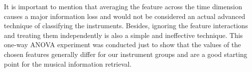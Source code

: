 It is important to mention that averaging the feature across the time dimension causes a major information loss and would not be considered an actual advanced technique of classifying the instruments. Besides, ignoring the feature interactions and treating them independently is also a simple and ineffective technique. This one-way ANOVA experiment was conducted just to show that the values of the chosen features generally differ for our instrument groups and are a good starting point for the musical information retrieval. 